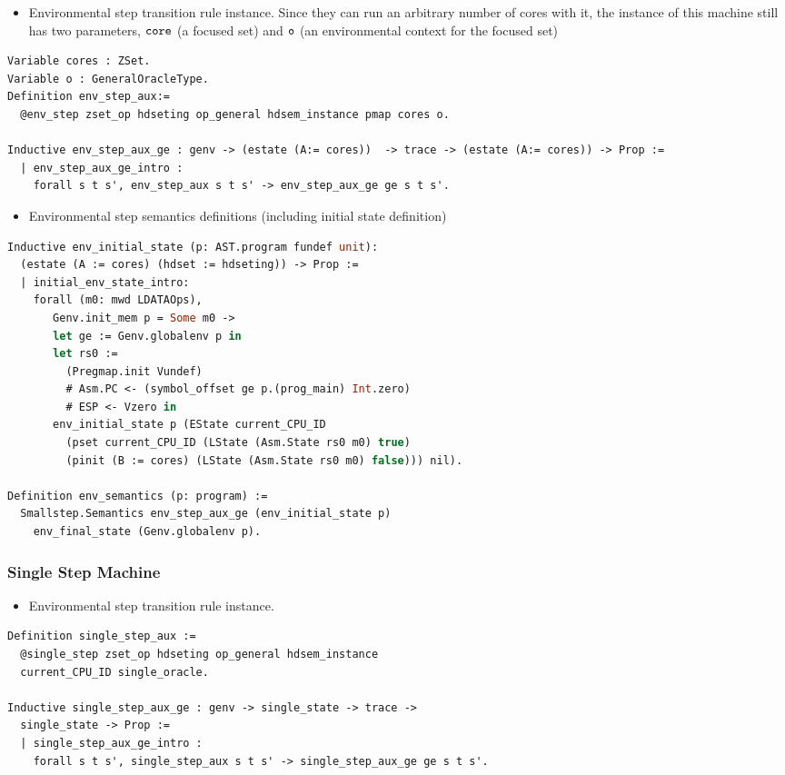 \begin{itemize}[leftmargin=*]
\item Environmental step transition rule instance. Since they can run an arbitrary number of cores with it, 
the instance of this machine still has two parameters, ${\mathrm{\texttt{core}}}$ (a focused set) and ${\mathrm{\texttt{o}}}$ (an environmental context for 
the focused set)
\end{itemize}
\begin{lstlisting}[language=Caml]
Variable cores : ZSet.
Variable o : GeneralOracleType.
Definition env_step_aux:=
  @env_step zset_op hdseting op_general hdsem_instance pmap cores o.

Inductive env_step_aux_ge : genv -> (estate (A:= cores))  -> trace -> (estate (A:= cores)) -> Prop :=
  | env_step_aux_ge_intro : 
    forall s t s', env_step_aux s t s' -> env_step_aux_ge ge s t s'.
\end{lstlisting}

\begin{itemize}[leftmargin=*]
\item Environmental step  semantics definitions (including initial state definition)
\end{itemize}
\begin{lstlisting}[language=Caml]
Inductive env_initial_state (p: AST.program fundef unit): 
  (estate (A := cores) (hdset := hdseting)) -> Prop :=
  | initial_env_state_intro: 
    forall (m0: mwd LDATAOps),
       Genv.init_mem p = Some m0 ->
       let ge := Genv.globalenv p in
       let rs0 :=
         (Pregmap.init Vundef)
         # Asm.PC <- (symbol_offset ge p.(prog_main) Int.zero)
         # ESP <- Vzero in
       env_initial_state p (EState current_CPU_ID 
         (pset current_CPU_ID (LState (Asm.State rs0 m0) true)
         (pinit (B := cores) (LState (Asm.State rs0 m0) false))) nil).

Definition env_semantics (p: program) :=
  Smallstep.Semantics env_step_aux_ge (env_initial_state p) 
    env_final_state (Genv.globalenv p).    
\end{lstlisting}

\subsubsection{Single Step Machine}    
\begin{itemize}[leftmargin=*]
\item Environmental step transition rule instance.
\end{itemize}
\begin{lstlisting}[language=Caml]
Definition single_step_aux :=
  @single_step zset_op hdseting op_general hdsem_instance 
  current_CPU_ID single_oracle.

Inductive single_step_aux_ge : genv -> single_state -> trace -> 
  single_state -> Prop :=
  | single_step_aux_ge_intro : 
    forall s t s', single_step_aux s t s' -> single_step_aux_ge ge s t s'.
\end{lstlisting}


